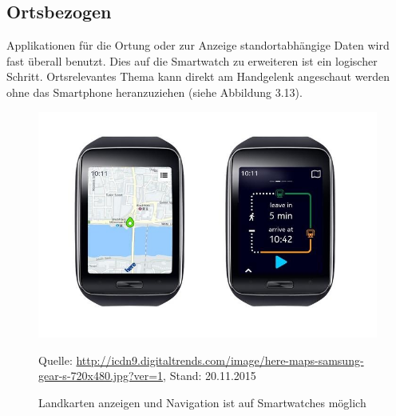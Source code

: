 \subsection{Ortsbezogen}
Applikationen für die Ortung oder zur Anzeige standortabhängige Daten wird fast überall benutzt. Dies auf die Smartwatch zu erweiteren ist ein logischer Schritt. Ortsrelevantes Thema kann direkt am Handgelenk angeschaut werden ohne das Smartphone heranzuziehen (siehe Abbildung 3.13).
\begin{figure}[H]
  \centering
  \includegraphics[scale=.5]{98_Bilder/03_Marktsegmente/watchmaps}
  \caption[Smartwatch und Landkarten]{Landkarten anzeigen und Navigation ist auf Smartwatches möglich}
  \footnotesize Quelle: \url{http://icdn9.digitaltrends.com/image/here-maps-samsung-gear-s-720x480.jpg?ver=1}, Stand: 20.11.2015
\end{figure}
